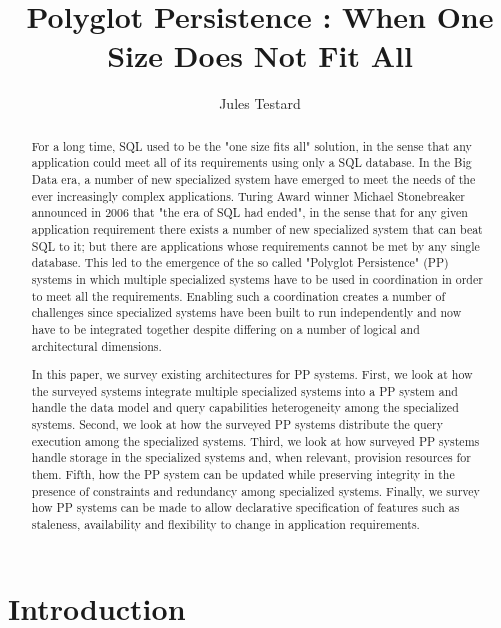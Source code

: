 \documentclass[11pt]{article}
\begin{document}
\title{Polyglot Persistence : When One Size Does Not Fit All}
\author{Jules Testard}
\maketitle

\begin{abstract}
For a long time, SQL used to be the "one size fits all" solution, in the sense that any application could meet all of its requirements using only a SQL database. In the Big Data era, a number of new specialized system have emerged to meet the needs of the ever increasingly complex applications. Turing Award winner Michael Stonebreaker announced in 2006 that "the era of SQL had ended", in the sense that for any given application requirement there exists a number of new specialized system that can beat SQL to it; but there are applications whose requirements cannot be met by any single database. This led to the emergence of the so called "Polyglot Persistence" (PP) systems in which multiple specialized systems have to be used in coordination in order to meet all the requirements. Enabling such a coordination creates a number of challenges since specialized systems have been built to run independently and now have to be integrated together despite differing on a number of logical and architectural dimensions.

In this paper, we survey existing architectures for PP systems. First, we look at how the surveyed systems integrate multiple specialized systems into a PP system and handle the data model and query capabilities heterogeneity among the specialized systems. Second, we look at how the surveyed PP systems distribute the query execution among the specialized systems. Third, we look at how surveyed PP systems handle storage in the specialized systems and, when relevant, provision resources for them. Fifth, how the PP system can be updated while preserving integrity in the presence of constraints and redundancy among specialized systems. Finally, we survey how PP systems can be made to allow declarative specification of features such as staleness, availability and flexibility to change in application requirements.
\end{abstract}

\section{Introduction}


\end{document}
